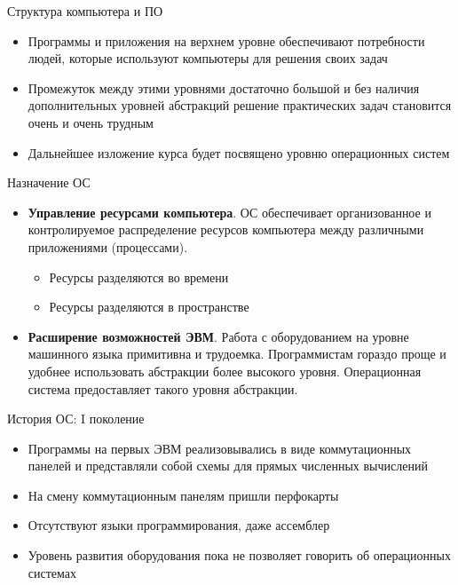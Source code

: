 \documentclass[aspectratio=169,14pt]{beamer}
\begin{document}
\begin{frame}{Структура компьютера и ПО}
    \begin{itemize}
        \item Программы и приложения на верхнем уровне обеспечивают потребности
        людей, которые используют компьютеры для решения своих задач
        \item Промежуток между этими уровнями достаточно большой и без
        наличия дополнительных уровней абстракций решение практических
        задач становится очень и очень трудным
        \item Дальнейшее изложение курса будет посвящено уровню операционных
        систем
    \end{itemize}
\end{frame}

\begin{frame}{Назначение ОС}
    \begin{itemize}
        \item \textbf{Управление ресурсами компьютера}. ОС обеспечивает
        организованное и контролируемое распределение ресурсов компьютера
        между различными приложениями (процессами).
        \begin{itemize}
            \item Ресурсы разделяются во времени
            \item Ресурсы разделяются в пространстве
        \end{itemize}
        \item \textbf{Расширение возможностей ЭВМ}. Работа с оборудованием на
        уровне машинного языка примитивна и трудоемка. Программистам гораздо
        проще и удобнее использовать абстракции более высокого уровня.
        Операционная система предоставляет такого уровня абстракции.
    \end{itemize}
\end{frame}

\begin{frame}{История ОС: I поколение}
    \begin{itemize}
        \item Программы на первых ЭВМ реализовывались в виде коммутационных
        панелей и представляли собой схемы для прямых численных вычислений
        \item На смену коммутационным панелям пришли перфокарты
        \item Отсутствуют языки программирования, даже ассемблер
        \item Уровень развития оборудования пока не позволяет говорить об
        операционных системах
    \end{itemize}
\end{frame}
\end{document}
